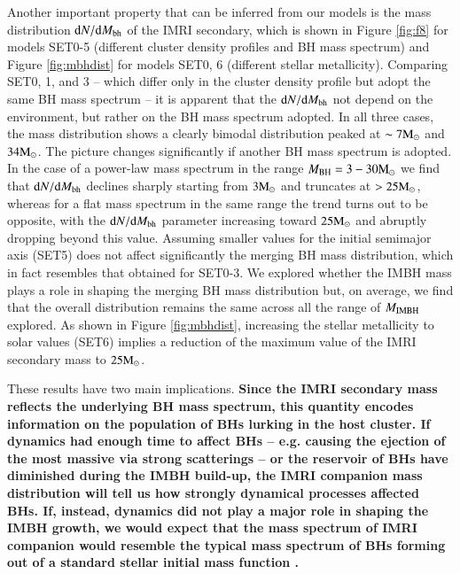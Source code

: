 \documentclass[article]{aa}
\newcommand{\Ms}{{\rm M}_\odot}
\newcommand{\ibh}{{\rm IMBH}}
\newcommand{\bh}{{\rm BH}}
\begin{document}
{Another important property that can be inferred from our models is the mass distribution ${\rm d}N/{\rm d}M_{\rm bh}$ of the IMRI secondary, which is shown in Figure \ref{fig:f8} for models SET0-5 (different cluster density profiles and BH mass spectrum) and Figure \ref{fig:mbhdist} for models SET0, 6 (different stellar metallicity). Comparing SET0, 1, and 3 -- which differ only in the cluster density profile but adopt the same BH mass spectrum \citep{spera17} -- it is apparent that the ${\rm d}N/{\rm d}M_{\rm bh}$ not depend on the environment, but rather on the BH mass spectrum adopted. In all three cases, the mass distribution shows a clearly bimodal distribution peaked at $\sim 7\Ms$ and $34\Ms$. The picture changes significantly if another BH mass spectrum is adopted. In the case of a power-law mass spectrum in the range $M_\bh = 3-30\Ms$ we find that ${\rm d}N/{\rm d}M_{\rm bh}$ declines sharply starting from $3\Ms$ and truncates at $> 25 \Ms$, whereas for a flat mass spectrum in the same range the trend turns out to be opposite, with the ${\rm d}N/{\rm d}M_{\rm bh}$ parameter increasing toward $25 \Ms$ and abruptly dropping beyond this value. Assuming smaller values for the initial semimajor axis (SET5) does not affect significantly the merging BH mass distribution, which in fact resembles that obtained for SET0-3. We explored whether the IMBH mass plays a role in shaping the merging BH mass distribution but, on average, we find that the overall distribution remains the same across all the range of $M_\ibh$ explored. As shown in Figure \ref{fig:mbhdist}, increasing the stellar metallicity to solar values (SET6) implies a reduction of the maximum value of the IMRI secondary mass to $25\Ms$. 

These results have two main implications. {\bf
Since the IMRI secondary mass reflects the underlying BH mass spectrum, this quantity 
encodes information on the population of BHs lurking in the host cluster. If dynamics had enough time to affect BHs -- e.g. causing the ejection of the most massive via strong scatterings -- or the reservoir of BHs have diminished during the IMBH build-up, the IMRI companion mass distribution will tell us how strongly dynamical processes affected BHs. If, instead, dynamics did not play a major role in shaping the IMBH growth, we would expect that the mass spectrum of IMRI companion would resemble the typical mass spectrum of BHs forming out of a standard stellar initial mass function \citep[e.g.][]{kroupa01}.}

}
\end{document}
